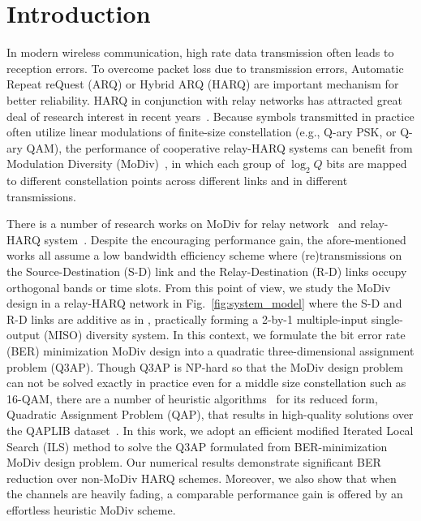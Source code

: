\documentclass[journal]{IEEEtran}
\begin{document}
\section{Introduction}
In modern wireless communication, high rate data transmission often leads
to reception errors. To overcome packet loss due to transmission errors, 
Automatic Repeat reQuest (ARQ) or Hybrid ARQ (HARQ) are important mechanism for
better reliability. HARQ in conjunction with relay networks has attracted great
deal of research interest in recent years~\cite{ngo2014hybrid}. Because symbols
transmitted in practice often utilize linear modulations of finite-size
constellation (e.g., Q-ary PSK, or Q-ary QAM), the performance of cooperative
relay-HARQ systems can benefit from Modulation Diversity 
(MoDiv)~\cite{benelli1992new}, in which each
group of $\log_2 Q$ bits are mapped to different constellation points across
different links and in different transmissions. 

There is a number of research works on MoDiv for relay
network~\cite{seddik2008trans, khormuji2008rate} and relay-HARQ
system~\cite{kim2009design, ryu2011ber}. Despite the encouraging
performance gain, the afore-mentioned works all assume a low bandwidth
efficiency scheme where (re)transmissions on the Source-Destination (S-D) link
and the Relay-Destination (R-D) links occupy orthogonal bands or time slots.
From this point of view, we study the MoDiv design in a relay-HARQ network in
Fig.~\ref{fig:system_model} where the S-D and R-D links are additive as in
\cite{cover1979capacity, nabar2004fading}, practically
forming a 2-by-1 multiple-input single-output (MISO) diversity system. In this
context, we formulate the bit error rate (BER) minimization MoDiv design into a
quadratic three-dimensional assignment problem (Q3AP). Though Q3AP is NP-hard so
that the MoDiv design problem can not be solved exactly in practice even for a
middle size constellation such as 16-QAM, there are a number of heuristic
algorithms~\cite{benlic2015memetic}
for its reduced form, Quadratic Assignment Problem (QAP), that results in
high-quality solutions over the QAPLIB dataset~\cite{burkard1997qaplib}. In this
work, we adopt an efficient modified Iterated Local Search (ILS) method to solve
the Q3AP formulated from BER-minimization MoDiv design problem. Our numerical
results demonstrate significant BER reduction over non-MoDiv HARQ schemes.
Moreover, we also show that when the channels are heavily fading, a comparable
performance gain is offered by an effortless heuristic MoDiv scheme.
\end{document}
